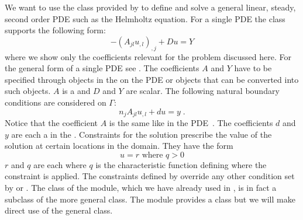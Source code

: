 We want to use the \LinearPDE class provided by \escript to define and solve a
general linear, steady, second order PDE such as the Helmholtz equation.
For a single PDE the \LinearPDE class supports the following form:
\begin{equation}\label{LINEARPDE.SINGLE.1 TUTORIAL}
-(A_{jl} u_{,l})_{,j}+D u = Y
\end{equation}
where we show only the coefficients relevant for the problem discussed here.
For the general form of a single PDE see .
The coefficients $A$ and $Y$ have to be specified through \Data objects in
the \Function on the PDE or objects that can be converted into such \Data objects.
$A$ is a \RankTwo and $D$ and $Y$ are scalar.
The following natural boundary conditions
are considered on $\Gamma$:
\begin{equation}\label{LINEARPDE.SINGLE.2 TUTORIAL}
n_{j}A_{jl} u_{,l}+d u= y  \;.
\end{equation}
Notice that the coefficient $A$ is the same like in the PDE~.
The coefficients $d$ and $y$ are each a \Scalar in the \FunctionOnBoundary.
Constraints for the solution prescribe the value of the
solution at certain locations in the domain. They have the form
\begin{equation}\label{LINEARPDE.SINGLE.3 TUTORIAL}
u=r \mbox{ where } q>0
\end{equation}
$r$ and $q$ are each \Scalar where $q$ is the characteristic function defining where the constraint is applied.
The constraints defined by  override any
other condition set by  or .
The \Poisson class of the \linearPDEs module, which we have already used in
, is in fact a subclass of the more general \LinearPDE class.
The \linearPDEs module provides a \Helmholtz class but we will make direct use
of the general \LinearPDE class.

